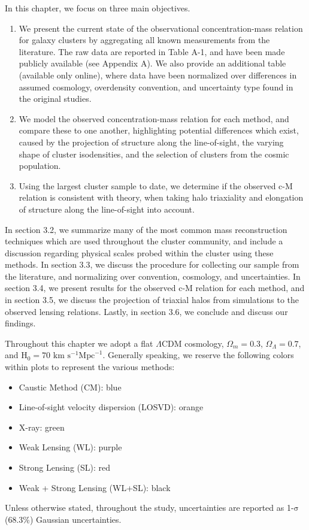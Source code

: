 \noindent In this chapter, we focus on three main objectives.

\begin{enumerate}
\item We present the current state of the observational concentration-mass
  relation for galaxy clusters by aggregating all known measurements from the
  literature. The raw data are reported in Table A-1, and have been made
  publicly available (see Appendix A). We also provide an additional table
  (available only online), where data have been normalized over differences in
  assumed cosmology, overdensity convention, and uncertainty type found in the
  original studies.

\item We model the observed concentration-mass relation for each method,
  and compare these to one another, highlighting potential differences which
  exist, caused by the projection of structure along the
  line-of-sight, the varying shape of cluster isodensities, and the selection
  of clusters from the cosmic population.

\item Using the largest cluster sample to date, we determine
  if the observed c-M relation is consistent with theory, when
  taking halo triaxiality and elongation of structure along the line-of-sight
  into account.
\end{enumerate}

In section 3.2, we summarize many of the most common mass reconstruction
techniques which are used throughout the cluster community, and include a
discussion regarding physical scales probed within the cluster using these
methods. In section 3.3, we discuss the procedure for collecting our sample from
the literature, and normalizing over convention, cosmology, and
uncertainties. In section 3.4, we present results for the observed c-M relation
for each method, and in section 3.5, we discuss the projection of triaxial halos
from simulations to the observed lensing relations. Lastly, in section 3.6, we
conclude and discuss our findings.

Throughout this chapter we adopt a flat $\Lambda$CDM cosmology, $\Omega_{m}=0.3$,
$\Omega_{\Lambda}=0.7$, and $\mathrm{H}_{0} = 70$ $\mathrm{km}$
${\mathrm{s}}^{-1} {\mathrm{Mpc}}^{-1}$. Generally speaking, we reserve the
following colors within plots to represent the various methods: 
\begin{itemize}
\item Caustic Method (CM): blue
\item Line-of-sight velocity dispersion (LOSVD): orange
\item X-ray: green
\item Weak Lensing (WL): purple
\item Strong Lensing (SL): red
\item Weak + Strong Lensing (WL+SL): black
\end{itemize}
Unless otherwise stated, throughout the study, uncertainties are reported as
1-$\mathrm{\sigma}$ (68.3\%) Gaussian uncertainties.

